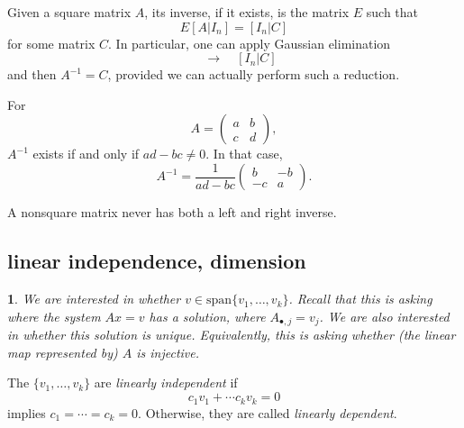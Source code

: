 \documentclass[12pt]{article}
\newtheorem{para}[theorem]{}
\begin{document}
\begin{corollary}
	Given a square matrix $A$, its inverse, if it exists, is the matrix $E$ such that 
	\begin{equation*}
		E[A|I_n] = [I_n | C] 
	\end{equation*}
	for some matrix $C$. In particular, one can apply Gaussian elimination 
	\begin{equation*}
		[A | I_n] \quad \to \quad [I_n | C] 
	\end{equation*}
	and then $A^{-1}=C$, provided we can actually perform such a reduction.
\end{corollary}

\begin{corollary}
	For 
	\begin{equation*}
		A = \begin{pmatrix} a & b \\ c & d \end{pmatrix},
	\end{equation*}
	$A^{-1}$ exists if and only if $ad-bc\neq 0$. In that case, 
	\begin{equation*}
		A^{-1} = \frac{1}{ad-bc} \begin{pmatrix} b & -b \\ -c & a \end{pmatrix}.
	\end{equation*}
\end{corollary}

\begin{proposition}
	A nonsquare matrix never has both a left and right inverse.
\end{proposition}


\subsection{linear independence, dimension} %

\begin{para} 
	We are interested in whether $v\in\text{span}\{v_1,\dots,v_k\}$. Recall that this is asking where the system $Ax=v$ has a solution, where $A_{\bullet, j}=v_j$. We are also interested in whether this solution is unique. Equivalently, this is asking whether (the linear map represented by) $A$ is injective.
\end{para}	

\begin{definition}
	The $\{v_1,\dots, v_k\}$ are \emph{linearly independent} if 
	\begin{equation*}
		c_1v_1 + \cdots c_k v_k = 0 
	\end{equation*}
	implies $c_1=\cdots =c_k=0$. Otherwise, they are called \emph{linearly dependent}.
\end{definition}
\end{document}
